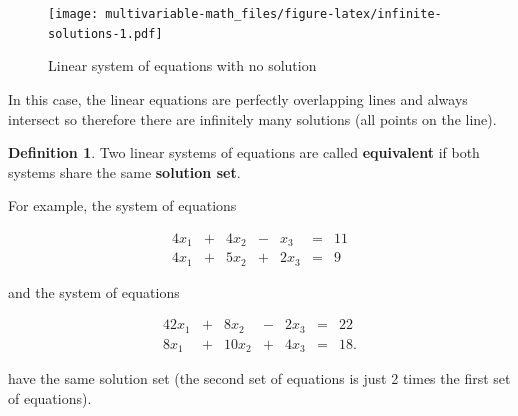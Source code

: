 \documentclass[
]{book}
\newenvironment{Shaded}{\begin{snugshade}}{\end{snugshade}}
\newcommand{\CommentTok}[1]{\textcolor[rgb]{0.56,0.35,0.01}{\textit{#1}}}
\newcommand{\DataTypeTok}[1]{\textcolor[rgb]{0.13,0.29,0.53}{#1}}
\newcommand{\FloatTok}[1]{\textcolor[rgb]{0.00,0.00,0.81}{#1}}
\newcommand{\KeywordTok}[1]{\textcolor[rgb]{0.13,0.29,0.53}{\textbf{#1}}}
\newcommand{\NormalTok}[1]{#1}
\newcommand{\OperatorTok}[1]{\textcolor[rgb]{0.81,0.36,0.00}{\textbf{#1}}}
\newcommand{\StringTok}[1]{\textcolor[rgb]{0.31,0.60,0.02}{#1}}
\theoremstyle{definition}
\newtheorem{definition}{Definition}[chapter]
\theoremstyle{definition}
\theoremstyle{definition}
\theoremstyle{remark}
\begin{document}
\begin{Shaded}
\end{Shaded}

\begin{figure}
\centering
\texttt{[image: multivariable-math\_files/figure-latex/infinite-solutions-1.pdf]}
\caption{\label{fig:infinite-solutions}Linear system of equations with no solution}
\end{figure}

In this case, the linear equations are perfectly overlapping lines and always intersect so therefore there are infinitely many solutions (all points on the line).

\begin{definition}
\protect\hypertarget{def:unnamed-chunk-32}{}{\label{def:unnamed-chunk-32} }Two linear systems of equations are called \textbf{equivalent} if both systems share the same \textbf{solution set}.
\end{definition}

For example, the system of equations

\begin{alignat*}{4}
x_1   & {}+{} & 4 x_2 & {}-{} & x_3 & {}={} & 11 \\
4 x_1 & {}+{} & 5 x_2 & {}+{} & 2 x_3 & {}={} & 9
\end{alignat*}

and the system of equations

\begin{alignat*}{4}
2x_1   & {}+{} & 8 x_2 & {}-{} & 2 x_3 & {}={} & 22 \\
8 x_1 & {}+{} & 10 x_2 & {}+{} & 4 x_3 & {}={} & 18.
\end{alignat*}

have the same solution set (the second set of equations is just 2 times the first set of equations).
\end{document}
